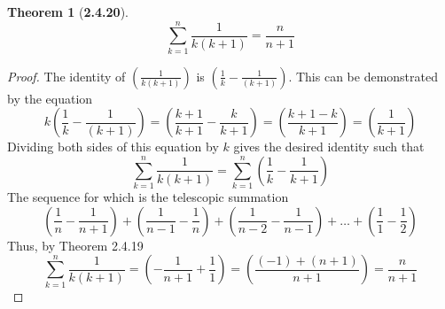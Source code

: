 \documentclass[a4paper, 12pt]{article}
\theoremstyle{plain}
\newtheorem*{theorem*}{Theorem}
\begin{document}
	
\begin{theorem*}[\textbf{2.4.20}]
    $$\sum_{k=1}^{n} \frac{1}{k(k+1)} = \frac{n}{n+1}$$
\end{theorem*}

\begin{proof}
    The identity of $\left(\frac{1}{k(k+1)}\right)$ is 
    $\left(\frac{1}{k} - \frac{1}{(k+1)}\right)$. This can be 
    demonstrated by the equation  
    $$k\left(\frac{1}{k} - \frac{1}{(k+1)}\right) = \left(\frac{k+1}{k+1} - \frac{k}{k+1}\right)
    = \left(\frac{k + 1 - k}{k+1}\right) = \left(\frac{1}{k+1}\right)$$ Dividing both sides of this equation by $k$ gives the desired
    identity such that
    $$\sum_{k=1}^n \frac{1}{k(k+1)} = \sum_{k=1}^{n} \left(\frac{1}{k} - \frac{1}{k+1}\right)$$
    The sequence for which is the telescopic summation
    $$\left(\frac{1}{n} - \frac{1}{n+1}\right) + \left(\frac{1}{n-1} - \frac{1}{n}\right) + 
    \left(\frac{1}{n-2} - \frac{1}{n-1}\right) + \dots + \left(\frac{1}{1} - \frac{1}{2}\right)$$ 
    Thus, by Theorem 2.4.19
    $$\sum_{k=1}^{n} \frac{1}{k(k+1)} = \left(-\frac{1}{n+1} + \frac{1}{1}\right) = \left(\frac{(-1) + (n+1)}{n+1}\right) = \frac{n}{n+1}$$
\end{proof}
\end{document}
